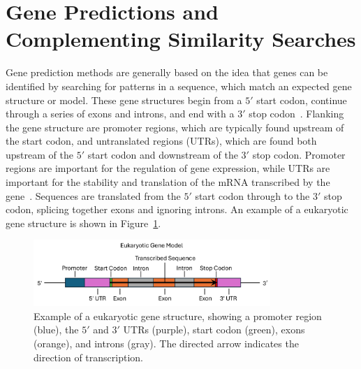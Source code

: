 

\section{Gene Predictions and Complementing Similarity Searches}\label{lit:similarity-searches}

Gene prediction methods are generally based on the idea that genes can be
identified by searching for patterns in a sequence, which match an expected gene structure or model. These gene structures begin from a $5'$ start codon, continue through a series of exons and introns, and end with a $3'$ stop codon~\cite{loftus2003a}. Flanking the gene structure are promoter regions, which are typically found upstream of the start codon, and untranslated regions (UTRs), which are found both upstream of the $5'$ start codon and downstream of the $3'$ stop codon. Promoter regions are important for the regulation of gene expression, while UTRs are important for the stability and translation of the mRNA transcribed by the gene~\cite{loftus2003a}. Sequences are translated from the $5'$ start codon through to the $3'$ stop codon, splicing together exons and ignoring introns. An example of a eukaryotic gene structure is shown in Figure~\ref{fig:gene-structure}.

\begin{figure}[ht]
    \centering
    \includegraphics[width=0.8\textwidth]{figures/gene-model-fig-msc.png}
    \caption[Generic gene model]{Example of a eukaryotic gene structure, showing a promoter region (blue), the $5'$ and $3'$ UTRs (purple), start codon (green), exons (orange), and introns (gray). The directed arrow indicates the direction of transcription. }\label{fig:gene-structure}
\end{figure}

